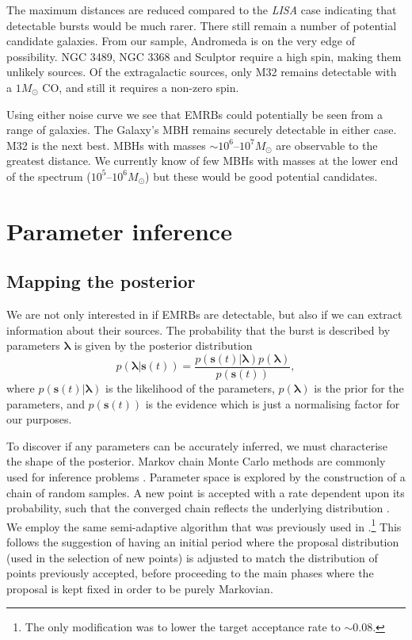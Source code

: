 \documentclass[useAMS,usedcolumn,usegraphicx,usenatbib]{mn2e}
\begin{document}
The maximum distances are reduced compared to the \textit{LISA} case indicating that detectable bursts would be much rarer. There still remain a number of potential candidate galaxies. From our sample, Andromeda is on the very edge of possibility. NGC 3489, NGC 3368 and Sculptor require a high spin, making them unlikely sources. Of the extragalactic sources, only M32 remains detectable with a $1 M_\odot$ CO, and still it requires a non-zero spin.

Using either noise curve we see that EMRBs could potentially be seen from a range of galaxies. The Galaxy's MBH remains securely detectable in either case. M32 is the next best. MBHs with masses $\sim 10^6$--$10^7 M_\odot$ are observable to the greatest distance. We currently know of few MBHs with masses at the lower end of the spectrum ($10^5$--$10^6 M_\odot$) but these would be good potential candidates.

\section{Parameter inference}\label{sec:Infer}

\subsection{Mapping the posterior}\label{sec:MCMC}

We are not only interested in if EMRBs are detectable, but also if we can extract information about their sources. The probability that the burst is described by parameters $\boldsymbol{\lambda}$ is given by the posterior distribution
\begin{equation}
p(\boldsymbol{\lambda}|\boldsymbol{s}(t)) = \frac{p(\boldsymbol{s}(t)|\boldsymbol{\lambda})p(\boldsymbol{\lambda})}{p(\boldsymbol{s}(t))},
\end{equation}
where $p(\boldsymbol{s}(t)|\boldsymbol{\lambda})$ is the likelihood of the parameters, $p(\boldsymbol{\lambda})$ is the prior for the parameters, and $p(\boldsymbol{s}(t))$ is the evidence which is just a normalising factor for our purposes.

To discover if any parameters can be accurately inferred, we must characterise the shape of the posterior. Markov chain Monte Carlo methods are commonly used for inference problems \citep[chapter 29]{MacKay2003}. Parameter space is explored by the construction of a chain of random samples. A new point is accepted with a rate dependent upon its probability, such that the converged chain reflects the underlying distribution \citep{Metropolis1953,Hastings1970}. We employ the same semi-adaptive algorithm that was previously used in \citet{Berry2013}.\footnote{The only modification was to lower the target acceptance rate to $\sim0.08$.} This follows the suggestion of \citet*{Haario1999} having an initial period where the proposal distribution (used in the selection of new points) is adjusted to match the distribution of points previously accepted, before proceeding to the main phases where the proposal is kept fixed in order to be purely Markovian.
\end{document}
